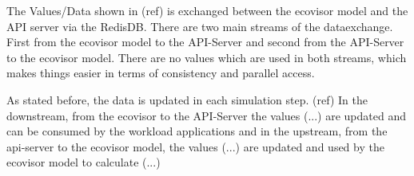 The Values/Data shown in (ref) is exchanged between the ecovisor model and the API server via the RedisDB. There are two main streams of the dataexchange.
First from the ecovisor model to the API-Server and second from the API-Server to the ecovisor model. There are no values which are used in both streams, which makes things
easier in terms of consistency and parallel access.

As stated before, the data is updated in each simulation step. (ref)
In the downstream, from the ecovisor to the API-Server the values (...) are updated and can be consumed by the workload applications
and in the upstream, from the api-server to the ecovisor model, the values (...) are updated and used by the ecovisor model to calculate (...) %

